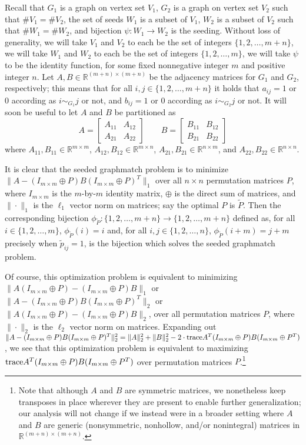 \documentclass[12pt]{article}
\newcommand{\R}{\mathbb{R}}
\newcommand{\tr}{\textup{trace}}
\begin{document}
Recall that $G_1$ is a graph on vertex set $V_1$, $G_2$ is a
graph on vertex set $V_2$ such that $\#V_1=\#V_2$, the set of seeds
$W_1$ is a subset of $V_1$, $W_2$ is a subset of $V_2$ such that
$\#W_1=\#W_2$, and bijection $\psi:W_1 \rightarrow W_2$
is the seeding. Without loss of generality, we will take
$V_1$ and $V_2$ to each be the set of integers $\{1,2,\ldots,m+n\}$,
we will take $W_1$ and $W_2$ to each be the set of integers
$\{ 1,2,\ldots,m \}$, we will take $\psi$ to be the identity
function, for some fixed nonnegative integer $m$ and positive integer $n$.
Let $A,B \in \R^{(m+n)\times (m+n)}$ be the adjacency matrices
for $G_1$ and $G_2$, respectively; this means that
for all $i,j \in \{1,2,\ldots,m+n\}$
it holds that $a_{ij}=1$ or $0$ according as $i \sim_{G_1} j$ or not,
and  $b_{ij}=1$ or $0$ according as $i \sim_{G_2} j$ or not.
It will soon be useful to let $A$ and $B$ be partitioned as
\[  A =\left [
\begin{array}{cc} A_{11} & A_{12} \\ A_{21} & A_{22} \end{array} \right ]
\ \ \ \ \ \ \ \ \ B =\left [
\begin{array}{cc} B_{11} & B_{12} \\ B_{21} & B_{22} \end{array} \right ]
\]
where $A_{11},B_{11}\in \R^{m \times m}$,
$A_{12},B_{12}\in \R^{m \times n}$, $A_{21},B_{21}\in \R^{n \times m}$, and
$A_{22},B_{22}\in \R^{n \times n}$.


It is clear that  the seeded graphmatch problem is to
minimize $\|A-(I_{m \times m}\oplus P)B(I_{m \times m}\oplus P)^T\|_1$ over all $n \times n$ permutation matrices $P$, where $I_{m \times m}$ is the $m$-by-$m$
identity matrix, $\oplus$ is the direct sum of matrices,
and $\| \cdot \|_1$ is the $\ell_1$  vector norm on matrices;
say the optimal $P$ is $\tilde{P}$.
Then the corresponding bijection $\phi_{\tilde{P}}: \{1,2,\ldots,m+n\} \rightarrow \{1,2,\ldots,m+n\}$
defined as, for all $i \in \{1,2,\ldots,m\}$, $\phi_{\tilde{P}}(i)=i$ and,
for all $i,j \in \{1,2,\ldots,n\}$, $\phi_{\tilde{P}} (i+m)=j+m$ precisely when $\tilde{p}_{ij}=1$, is the bijection which solves the seeded graphmatch problem.

Of course, this optimization problem is equivalent to minimizing
$\|A(I_{m \times m}\oplus P)-(I_{m \times m}\oplus P)B\|_1$ or
$\|A-(I_{m \times m}\oplus P)B(I_{m \times m}\oplus P)^T\|_2$ or
$\|A(I_{m \times m}\oplus P)-(I_{m \times m}\oplus P)B\|_2$, over all
permutation matrices $P$,
where $\| \cdot \|_2$ is the $\ell_2$ vector norm on matrices.
Expanding out $\|A-(I_{m \times m}\oplus P)B(I_{m \times m}\oplus P)^T\|_2^2=
\|A\|_2^2 + \|B\|_2^2
- 2 \cdot \tr A^T(I_{m \times m}\oplus P)B(I_{m \times m}\oplus P^T)$,
we see that this optimization problem is equivalent to maximizing $\tr A^T(I_{m \times m}\oplus P)B(I_{m \times m}\oplus P^T)$
over permutation matrices $P$.\footnote{Note that although $A$ and $B$ are
symmetric matrices, we nonetheless keep transposes in place wherever
they are present to enable further generalization;
our analysis will not change if we instead were
in a broader setting where $A$ and $B$ are
generic (nonsymmetric, nonhollow, and/or nonintegral) matrices in
$\R^{(m+n)\times (m+n)}$.}
\end{document}
